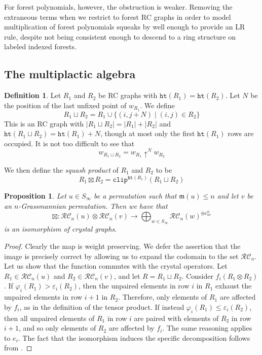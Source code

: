 \documentclass[a4paper,fleqn]{cas-sc}
\newtheorem{proposition}[lemma]{Proposition}
\theoremstyle{definition}
\newtheorem{definition}[lemma]{Definition}
\theoremstyle{remark}
\numberwithin{equation}{subsection}
\newcommand{\shup}{{\uparrow}}
\newcommand{\wof}[1]{w_{#1}}
\newcommand{\hr}{\mathtt{ht}}
\newcommand{\clp}{\mathtt{clip}}
\newcommand{\RC}{\mathcal{RC}}
\newcommand{\maxd}{\mathfrak{m}}
\begin{document}
For forest polynomials, however, the obstruction is weaker. Removing the extraneous terms when we restrict to forest RC graphs in order to model multiplication of forest polynomials squeaks by well enough to provide an LR rule, despite not being consistent enough to descend to a ring structure on labeled indexed forests.


\subsection{The multiplactic algebra}\label{section:multiplactic}
\begin{definition}
Let $R_1$ and $R_2$ be RC graphs with $\hr(R_1)=\hr(R_2)$. Let $N$ be the position of the last unfixed point of $\wof{R_1}$. We define
$$R_1\sqcup R_2 = R_1\cup \{(i,j+N)\mid (i,j)\in R_2\}$$
This is an RC graph with $|R_1\sqcup R_2| = |R_1| + |R_2|$ and $\hr(R_1\sqcup R_2)=\hr(R_1) + N$, though at most only the first $\hr(R_1)$ rows are occupied.  It is not too difficult to see that
$$\wof{R_1\sqcup R_2} = \wof{R_1}\shup^{N}\wof{R_2}$$

We then define the \emph{squash product} of $R_1$ and $R_2$ to be
$$R_1\boxtimes R_2 = \clp^{\hr(R_1)}(R_1\sqcup R_2)$$

\end{definition}

\begin{proposition} \label{proposition:boxproduct}
  Let $u\in S_\infty$ be a permutation such that $\maxd(u)\leq n$ and let $v$ be an $n$-Grassmannian permutation. Then we have that
  $$\boxtimes:\RC_n(u)\otimes \RC_n(v)\to \bigoplus_{w\in S_\infty} \RC_n(w)^{\oplus c_{uv}^w}$$
  is an isomorphism of crystal graphs. 
\end{proposition}
\begin{proof}
Clearly the map is weight preserving. We defer the assertion that the image is precisely correct by allowing us to expand the codomain to the set $\RC_n$. 
Let us show that the function commutes with the crystal operators. Let $R_1\in \RC_n(u)$ and $R_2\in \RC_n(v)$, and let $R=R_1\sqcup R_2$. Consider $f_i(R_1\otimes R_2)$. If $\varphi_i(R_1)>\varepsilon_i(R_2)$, then the unpaired elements in row $i$ in $R_1$ exhaust the unpaired elements in row $i+1$ in $R_2$. Therefore, only elements of $R_1$ are affected by $f_i$, as in the definition of the tensor product. If instead $\varphi_i(R_1)\leq \varepsilon_i(R_2)$, then all unpaired elements of $R_1$ in row $i$ are paired with elements of $R_2$ in row $i+1$, and so only elements of $R_2$ are affected by $f_i$. The same reasoning applies to $e_i$. The fact that the isomorphism induces the specific decomposition follows from \cite{kouno2020decomposition}.
\end{proof}
\end{document}
